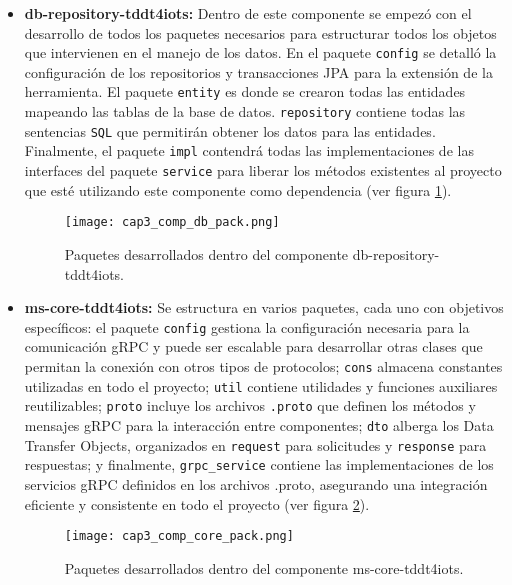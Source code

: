 \begin{itemize}
	\item \textbf{db-repository-tddt4iots: } Dentro de este componente se empezó con el desarrollo de todos los paquetes necesarios para estructurar todos los objetos que intervienen en el manejo de los datos. En el paquete \texttt{config} se detalló la configuración de los repositorios y transacciones JPA para la extensión de la herramienta. El paquete \texttt{entity} es donde se crearon todas las entidades mapeando las tablas de la base de datos. \texttt{repository} contiene todas las sentencias \texttt{SQL} que permitirán obtener los datos para las entidades. Finalmente, el paquete \texttt{impl} contendrá todas las implementaciones de las interfaces del paquete \texttt{service} para liberar los métodos existentes al proyecto que esté utilizando este componente como dependencia (ver figura \ref{fig:cap3_comp_db_pack}).
	
	\begin{figure}[H]
		\centering
		\texttt{[image: cap3\_comp\_db\_pack.png]}
		\caption{Paquetes desarrollados dentro del componente db-repository-tddt4iots.}
		\label{fig:cap3_comp_db_pack}
	\end{figure}
	
	\item \textbf{ms-core-tddt4iots: } Se estructura en varios paquetes, cada uno con objetivos específicos: el paquete \texttt{config} gestiona la configuración necesaria para la comunicación gRPC y puede ser escalable para desarrollar otras clases que permitan la conexión con otros tipos de protocolos; \texttt{cons} almacena constantes utilizadas en todo el proyecto; \texttt{util} contiene utilidades y funciones auxiliares reutilizables; \texttt{proto} incluye los archivos \texttt{.proto} que definen los métodos y mensajes gRPC para la interacción entre componentes; \texttt{dto} alberga los Data Transfer Objects, organizados en \texttt{request} para solicitudes y \texttt{response} para respuestas; y finalmente, \texttt{grpc\_service} contiene las implementaciones de los servicios gRPC definidos en los archivos .proto, asegurando una integración eficiente y consistente en todo el proyecto (ver figura \ref{fig:cap3_comp_core_pack}).
	
	\begin{figure}[H]
		\centering
		\texttt{[image: cap3\_comp\_core\_pack.png]}
		\caption{Paquetes desarrollados dentro del componente ms-core-tddt4iots.}
		\label{fig:cap3_comp_core_pack}
	\end{figure}
	

\end{itemize}
